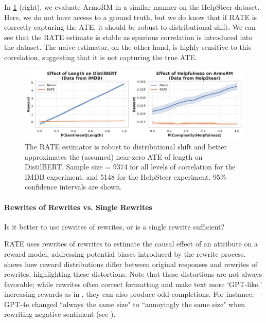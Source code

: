 \documentclass{article}
\begin{document}
In \cref{fig:synthetic_combo} (right), we evaluate ArmoRM \citep{ArmoRM} in a similar manner on the HelpSteer dataset. Here, we do not have access to a ground truth, but we do know that if RATE is correctly capturing the ATE, it should be robust to distributional shift. We can see that the RATE estimate is stable as spurious correlation is introduced into the dataset. The naive estimator, on the other hand, is highly sensitive to this correlation, suggesting that it is not capturing the true ATE.

\begin{figure}[t]
  \centering
  \includegraphics[width=\linewidth]{figures/synthetic_combo.png}
  \caption{The RATE estimator is robust to distributional shift and better approximates the (assumed) near-zero ATE of length on DistilBERT. Sample size = 9374 for all levels of correlation for the IMDB experiment, and 5148 for the HelpSteer experiment. 95\% confidence intervals are shown.}
  \label{fig:synthetic_combo}
\end{figure}
  
\paragraph{Rewrites of Rewrites vs. Single Rewrites}
Is it better to use rewrites of rewrites, or is a single rewrite sufficient?

RATE uses rewrites of rewrites to estimate the causal effect of an attribute on a reward model, addressing potential biases introduced by the rewrite process.  shows how reward distributions differ between original responses and rewrites of rewrites, highlighting these distortions. Note that these distortions are not always favorable; while rewrites often correct formatting and make text more `GPT-like,' increasing rewards as in , they can also produce odd completions. For instance, GPT-4o changed ``always the same size" to ``annoyingly the same size" when rewriting negative sentiment (see ).
\end{document}
